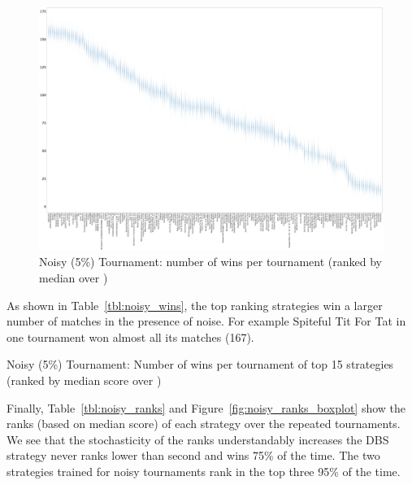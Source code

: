 \documentclass{article}
\begin{document}
\begin{landscape}
    \begin{figure}[!hbtp]
        \centering
        \includegraphics[width=\paperwidth]{./assets/noisy_wins_boxplots.pdf}
        \caption{Noisy (5\%) Tournament: number of wins per tournament (ranked by
        median over
        \protecttournaments)}
        \label{fig:noisy_winplot}
    \end{figure}
\end{landscape}

As shown in Table~\ref{tbl:noisy_wins}, the top ranking strategies win a larger
number of matches in the presence of noise. For example Spiteful Tit For Tat in
one tournament won almost all its matches (167).

\begin{table}[!hbtp]
    \centering
        
        \caption{Noisy (5\%) Tournament: Number of wins per tournament
        of top 15 strategies (ranked by median score over
        \protecttournaments)}
        \label{tbl:noisy_wins}
\end{table}


Finally, Table~\ref{tbl:noisy_ranks} and
Figure~\ref{fig:noisy_ranks_boxplot} show the ranks (based on median score)
of each strategy over the repeated tournaments. We see that the stochasticity
of the ranks understandably increases the DBS strategy never ranks lower than
second and wins 75\% of the time. The two strategies trained for noisy
tournaments rank in the top three 95\% of the time.
\end{document}
